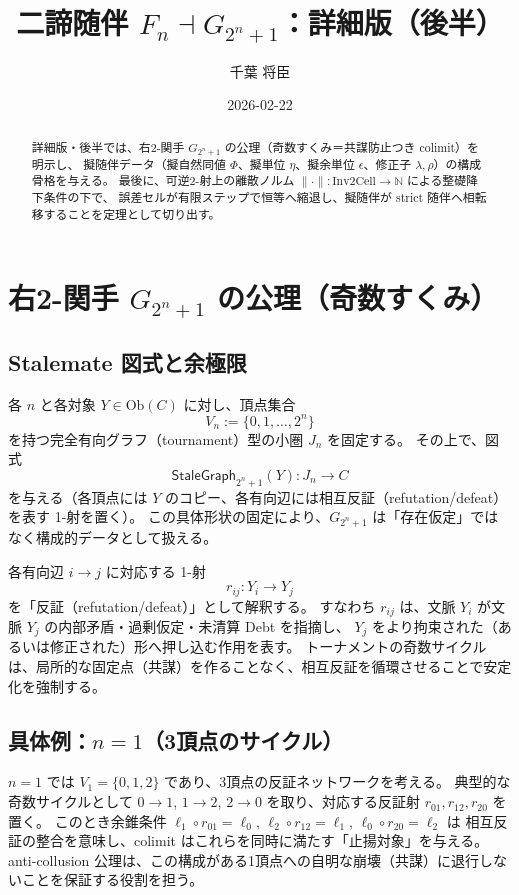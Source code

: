 \documentclass[a4paper,11pt]{article}
\title{二諦随伴 \texorpdfstring{$F_n \dashv G_{2^n+1}$}{Fn dashv G(2^n+1)}：詳細版（後半）}
\author{千葉 将臣}
\date{2026-02-22}
\begin{document}
\maketitle

\begin{abstract}
詳細版・後半では、右2-関手 $G_{2^n+1}$ の公理（奇数すくみ＝共謀防止つき colimit）を明示し、
擬随伴データ（擬自然同値 $\Phi$、擬単位 $\eta$、擬余単位 $\epsilon$、修正子 $\lambda,\rho$）の構成骨格を与える。
最後に、可逆2-射上の離散ノルム $\|\cdot\|:\mathrm{Inv2Cell}\to\mathbb{N}$ による整礎降下条件の下で、
誤差セルが有限ステップで恒等へ縮退し、擬随伴が strict 随伴へ相転移することを定理として切り出す。
\end{abstract}

\tableofcontents

\section{右2-関手 \texorpdfstring{$G_{2^n+1}$}{G(2\string^n+1)} の公理（奇数すくみ）}
\subsection{Stalemate 図式と余極限}
\begin{definition}
各 $n$ と各対象 $Y\in\mathrm{Ob}(C)$ に対し、頂点集合
\[
  V_n:=\{0,1,\dots,2^n\}
\]
を持つ完全有向グラフ（tournament）型の小圏 $J_n$ を固定する。
その上で、図式
\[
  \mathsf{StaleGraph}_{2^n+1}(Y):J_n\to C
\]
を与える（各頂点には $Y$ のコピー、各有向辺には相互反証（refutation/defeat）を表す 1-射を置く）。
この具体形状の固定により、$G_{2^n+1}$ は「存在仮定」ではなく構成的データとして扱える。
\end{definition}

\begin{definition}
各有向辺 $i\to j$ に対応する 1-射
\[
  r_{ij}:Y_i\to Y_j
\]
を「反証（refutation/defeat）」として解釈する。
すなわち $r_{ij}$ は、文脈 $Y_i$ が文脈 $Y_j$ の内部矛盾・過剰仮定・未清算 Debt を指摘し、
$Y_j$ をより拘束された（あるいは修正された）形へ押し込む作用を表す。
トーナメントの奇数サイクルは、局所的な固定点（共謀）を作ることなく、相互反証を循環させることで安定化を強制する。
\end{definition}

\subsection{具体例：\texorpdfstring{$n=1$}{n=1}（3頂点のサイクル）}
\begin{remark}
$n=1$ では $V_1=\{0,1,2\}$ であり、3頂点の反証ネットワークを考える。
典型的な奇数サイクルとして $0\to 1$, $1\to 2$, $2\to 0$ を取り、対応する反証射 $r_{01},r_{12},r_{20}$ を置く。
このとき余錐条件 $\ell_1\circ r_{01}=\ell_0$, $\ell_2\circ r_{12}=\ell_1$, $\ell_0\circ r_{20}=\ell_2$ は
相互反証の整合を意味し、colimit はこれらを同時に満たす「止揚対象」を与える。
anti-collusion 公理は、この構成がある1頂点への自明な崩壊（共謀）に退行しないことを保証する役割を担う。
\end{remark}
\end{document}

